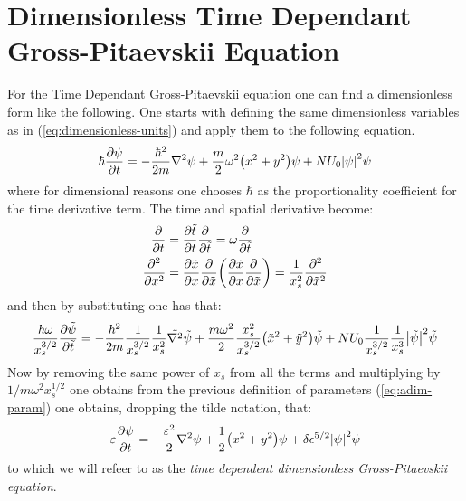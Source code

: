 \documentclass[a4paper,10pt]{article}
\begin{document}
\section{Dimensionless Time Dependant Gross-Pitaevskii Equation}
For the Time Dependant Gross-Pitaevskii equation one can find a dimensionless form like the following. One starts with defining the same dimensionless variables as in (\ref{eq:dimensionless-units}) and apply them to the following equation.
\begin{equation*}
	\hbar \pdv{\psi}{t} = -\frac{\hbar^2}{2m} \laplacian \psi + \frac{m}{2}\omega^2\qty(x^2 + y^2) \psi + NU_0 \abs{\psi}^2 \psi
\end{equation*}
where for dimensional reasons one chooses $\hbar$ as the proportionality coefficient for the time derivative term. The time and spatial derivative become:
\begin{align*}
	\pdv{t} &= \pdv{\tilde{t}}{t} \pdv{\tilde{t}} = \omega \pdv{\tilde{t}} \\
	\pdv[2]{x} &= \pdv{\tilde{x}}{x} \pdv{\tilde{x}} \qty(\pdv{\tilde{x}}{x} \pdv{\tilde{x}}) = \frac{1}{x_s^2} \pdv[2]{\tilde{x}}
\end{align*}
and then by substituting one has that:
\begin{equation*}
	\frac{\hbar \omega}{x_s^{3/2}} \pdv{\tilde{\psi}}{\tilde{t}} = -\frac{\hbar^2}{2m} \frac{1}{x_s^{3/2}}\frac{1}{x_s^2} \tilde{\laplacian} \tilde{\psi} + \frac{m\omega^2}{2}\frac{x_s^2}{x_s^{3/2}}\qty(\tilde{x}^2 + \tilde{y}^2) \tilde{\psi} + NU_0\frac{1}{x_s^{3/2}}\frac{1}{x_s^{3}} \abs{\tilde{\psi}}^2 \tilde{\psi}
\end{equation*}
Now by removing the same power of $x_s$ from all the terms and multiplying by $1/m\omega^2 x_s^{1/2}$ one obtains from the previous definition of parameters (\ref{eq:adim-param}) one obtains, dropping the tilde notation, that:
\begin{equation}
	\varepsilon \pdv{\psi}{t} = -\frac{\varepsilon^2}{2} \laplacian \psi + \frac{1}{2} \qty(x^2 + y^2) \psi + \delta \epsilon^{5/2} \abs{\psi}^2 \psi
\end{equation}
to which we will refeer to as the \textit{time dependent dimensionless Gross-Pitaevskii equation}.
\end{document}

